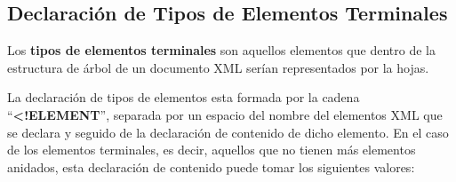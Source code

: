 \subsection{Declaración de Tipos de Elementos Terminales}

Los \textbf{tipos de elementos terminales} son aquellos elementos que dentro de la estructura de árbol de un documento XML serían representados por la hojas.

La declaración de tipos de elementos esta formada por la cadena ``\textbf{<!ELEMENT}'', separada por un espacio del nombre del elementos XML que se declara y seguido de la declaración de contenido de dicho elemento. En el caso de los elementos terminales, es decir, aquellos que no tienen más elementos anidados, esta declaración de contenido puede tomar los siguientes valores:

